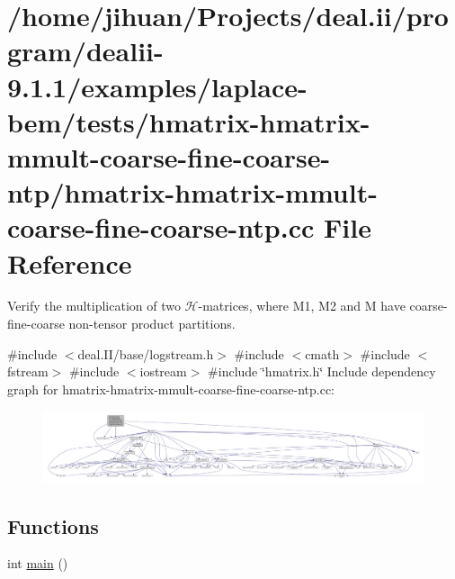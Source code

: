 \hypertarget{hmatrix-hmatrix-mmult-coarse-fine-coarse-ntp_8cc}{}\section{/home/jihuan/\+Projects/deal.ii/program/dealii-\/9.1.1/examples/laplace-\/bem/tests/hmatrix-\/hmatrix-\/mmult-\/coarse-\/fine-\/coarse-\/ntp/hmatrix-\/hmatrix-\/mmult-\/coarse-\/fine-\/coarse-\/ntp.cc File Reference}
\label{hmatrix-hmatrix-mmult-coarse-fine-coarse-ntp_8cc}


Verify the multiplication of two $\mathcal{H}$-\/matrices, where M1, M2 and M have coarse-\/fine-\/coarse non-\/tensor product partitions.  


{\ttfamily \#include $<$deal.\+I\+I/base/logstream.\+h$>$}\newline
{\ttfamily \#include $<$cmath$>$}\newline
{\ttfamily \#include $<$fstream$>$}\newline
{\ttfamily \#include $<$iostream$>$}\newline
{\ttfamily \#include \char`\"{}hmatrix.\+h\char`\"{}}\newline
Include dependency graph for hmatrix-\/hmatrix-\/mmult-\/coarse-\/fine-\/coarse-\/ntp.cc\+:
\nopagebreak
\begin{figure}[H]
\begin{center}
\leavevmode
\includegraphics[width=350pt]{hmatrix-hmatrix-mmult-coarse-fine-coarse-ntp_8cc__incl}
\end{center}
\end{figure}
\subsection*{Functions}
\begin{DoxyCompactItemize}
\item 
int \hyperlink{hmatrix-hmatrix-mmult-coarse-fine-coarse-ntp_8cc_ae66f6b31b5ad750f1fe042a706a4e3d4}{main} ()
\end{DoxyCompactItemize}


